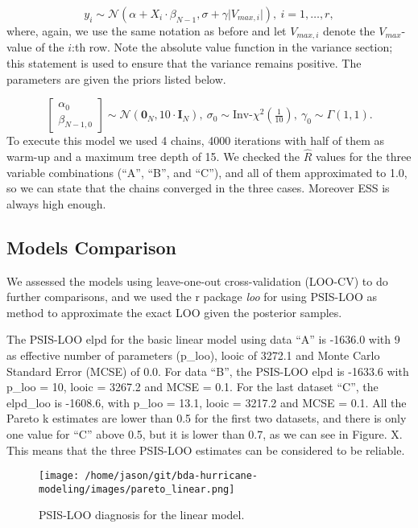 \documentclass[
]{article}
\begin{document}
\[ y_{i} \sim \mathcal{N}(\alpha + X_i \cdot\beta_{N-1}, \sigma + \gamma\vert V_{max,i} \vert ), \ i=1,\dots,r, \]
where, again, we use the same notation as before and let \(V_{max,i}\)
denote the \(V_{max}\)-value of the \(i\):th row. Note the absolute
value function in the variance section; this statement is used to ensure
that the variance remains positive. The parameters are given the priors
listed below.

\[\begin{bmatrix} \alpha_0 \\ \beta_{N-1,0} \end{bmatrix} \sim \mathcal{N}(\mathbf{0}_N, 10 \cdot \mathbf{I}_N), \ \sigma_0 \sim \textrm{Inv-}\chi^2(\tfrac{1}{10}), \ \gamma_0 \sim \Gamma(1,1) .\]
To execute this model we used 4 chains, 4000 iterations with half of
them as warm-up and a maximum tree depth of 15. We checked the
\(\hat{R}\) values for the three variable combinations (``A'', ``B'',
and ``C''), and all of them approximated to 1.0, so we can state that
the chains converged in the three cases. Moreover ESS is always high
enough.

\hypertarget{models-comparison}{%
\subsection{Models Comparison}\label{models-comparison}}

We assessed the models using leave-one-out cross-validation (LOO-CV) to
do further comparisons, and we used the r package \textit{loo} for using
PSIS-LOO as method to approximate the exact LOO given the posterior
samples.

The PSIS-LOO elpd for the basic linear model using data ``A'' is -1636.0
with 9 as effective number of parameters (p\_loo), looic of 3272.1 and
Monte Carlo Standard Error (MCSE) of 0.0. For data ``B'', the PSIS-LOO
elpd is -1633.6 with p\_loo = 10, looic = 3267.2 and MCSE = 0.1. For the
last dataset ``C'', the elpd\_loo is -1608.6, with p\_loo = 13.1, looic
= 3217.2 and MCSE = 0.1. All the Pareto k estimates are lower than 0.5
for the first two datasets, and there is only one value for ``C'' above
0.5, but it is lower than 0.7, as we can see in Figure. X. This means
that the three PSIS-LOO estimates can be considered to be reliable.

\begin{figure}
\centering
\texttt{[image: /home/jason/git/bda-hurricane-modeling/images/pareto\_linear.png]}
\caption{PSIS-LOO diagnosis for the linear model.}
\end{figure}
\end{document}
